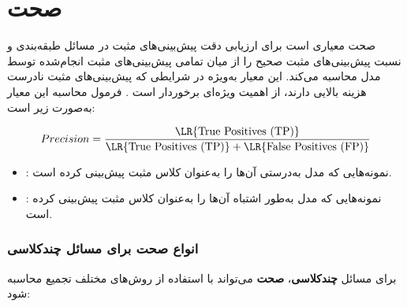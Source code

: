 \section{صحت}
صحت معیاری است برای ارزیابی دقت پیش‌بینی‌های مثبت در مسائل طبقه‌بندی و نسبت پیش‌بینی‌های مثبت صحیح را از میان تمامی پیش‌بینی‌های مثبت انجام‌شده توسط مدل محاسبه می‌کند. این معیار به‌ویژه در شرایطی که پیش‌بینی‌های مثبت نادرست هزینه بالایی دارند، از اهمیت ویژه‌ای برخوردار است \cite{ref_powers2011}. فرمول محاسبه این معیار به‌صورت زیر است:

\begin{equation}
	Precision = \frac{\text{\LR{True Positives (TP)}}}{\text{\LR{True Positives (TP)}} + \text{\LR{False Positives (FP)}}}
\end{equation}

\begin{itemize}
	\item \textbf{}: نمونه‌هایی که مدل به‌درستی آن‌ها را به‌عنوان کلاس مثبت پیش‌بینی کرده است.
	\item \textbf{}: نمونه‌هایی که مدل به‌طور اشتباه آن‌ها را به‌عنوان کلاس مثبت پیش‌بینی کرده است.
\end{itemize}

\subsubsection{انواع صحت برای مسائل چندکلاسی}

برای مسائل \textbf{چندکلاسی}، \textbf{صحت} می‌تواند با استفاده از روش‌های مختلف تجمیع محاسبه شود:

